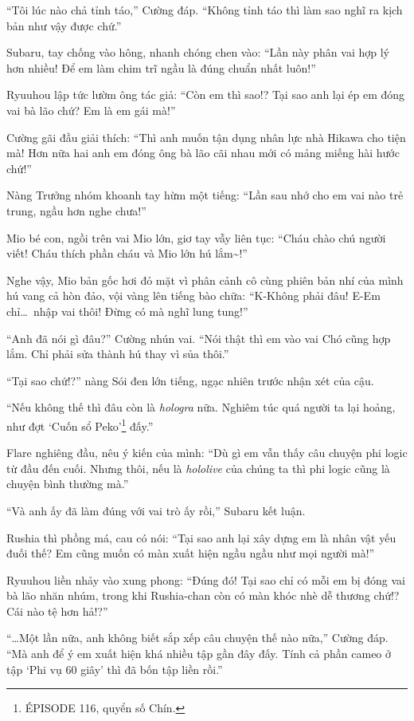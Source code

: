 \documentclass[../main.tex]{subfiles}
\begin{document}
``Tôi lúc nào chả tỉnh táo,'' Cường đáp. ``Không tỉnh táo thì làm sao nghĩ ra kịch bản như vậy được chứ.''

Subaru, tay chống vào hông, nhanh chóng chen vào: ``Lần này phân vai hợp lý hơn nhiều! Để em làm chim trĩ ngầu là đúng chuẩn nhất luôn!''

Ryuuhou lập tức lườm ông tác giả: ``Còn em thì sao!? Tại sao anh lại ép em đóng vai bà lão chứ? Em là em gái mà!''

Cường gãi đầu giải thích: ``Thì anh muốn tận dụng nhân lực nhà Hikawa cho tiện mà! Hơn nữa hai anh em đóng ông bà lão cãi nhau mới có mảng miếng hài hước chứ!''

Nàng Trưởng nhóm khoanh tay hừm một tiếng: ``Lần sau nhớ cho em vai nào trẻ trung, ngầu hơn nghe chưa!''

Mio bé con, ngồi trên vai Mio lớn, giơ tay vẫy liên tục: ``Cháu chào chú người viết! Cháu thích phần cháu và Mio lớn hú lắm\~{}!''

Nghe vậy, Mio bản gốc hơi đỏ mặt vì phân cảnh cô cùng phiên bản nhí của mình hú vang cả hòn đảo, vội vàng lên tiếng bào chữa: ``K-Không phải đâu! E-Em chỉ\dots\ nhập vai thôi! Đừng có mà nghĩ lung tung!''

``Anh đã nói gì đâu?'' Cường nhún vai. ``Nói thật thì em vào vai Chó cũng hợp lắm. Chỉ phải sửa thành hú thay vì sủa thôi.''

``Tại sao chứ!?'' nàng Sói đen lớn tiếng, ngạc nhiên trước nhận xét của cậu.

``Nếu không thế thì đâu còn là \textit{hologra} nữa. Nghiêm túc quá người ta lại hoảng, như đợt `Cuốn sổ Peko'\footnote{{\flaregothic ÉPISODE 116}, quyển số Chín.} đấy.''

Flare nghiêng đầu, nêu ý kiến của mình: ``Dù gì em vẫn thấy câu chuyện phi logic từ đầu đến cuối. Nhưng thôi, nếu là \textit{hololive} của chúng ta thì phi logic cũng là chuyện bình thường mà.''

``Và anh ấy đã làm đúng với vai trò ấy rồi,'' Subaru kết luận.

Rushia thì phồng má, cau có nói: ``Tại sao anh lại xây dựng em là nhân vật yếu đuối thế? Em cũng muốn có màn xuất hiện ngầu ngầu như mọi người mà!''

Ryuuhou liền nhảy vào xung phong: ``Đúng đó! Tại sao chỉ có mỗi em bị đóng vai bà lão nhăn nhúm, trong khi Rushia-chan còn có màn khóc nhè dễ thương chứ!? Cái nào tệ hơn hả!?''

``\dots Một lần nữa, anh không biết sắp xếp câu chuyện thế nào nữa,'' Cường đáp. ``Mà anh để ý em xuất hiện khá nhiều tập gần đây đấy. Tính cả phần cameo ở tập `Phi vụ 60 giây' thì đã bốn tập liền rồi.''
\end{document}
